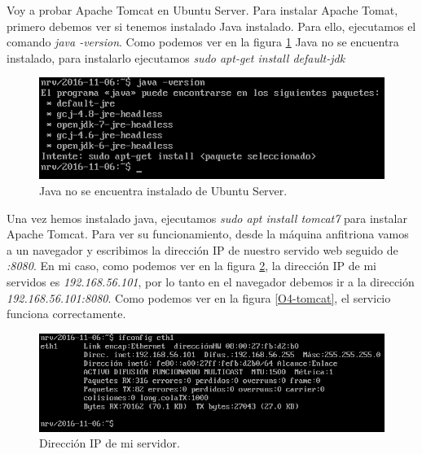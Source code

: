 \documentclass[a4paper,titlepage,12pt]{scrartcl}	%
\numberwithin{figure}{section} %
\numberwithin{table}{section} %
\begin{document}
	Voy a probar Apache Tomcat \cite{apachetomcat} en Ubuntu Server. Para instalar Apache Tomat, primero debemos ver si tenemos instalado Java instalado. Para ello, ejecutamos el comando \textit{java -version}. Como podemos ver en la figura \ref{O4-javaversion} Java no se encuentra instalado, para instalarlo ejecutamos \textit{sudo apt-get install default-jdk}
	\begin{figure}[H]
		\includegraphics[width=\linewidth]{./Imagenes/O4-javaversion.png}
		\vspace{-0.5cm}
		\caption[Java no se encuentra instalado de Ubuntu Server.]{Java no se encuentra instalado de Ubuntu Server.}
		\label{O4-javaversion}
	\end{figure}
	
	Una vez hemos instalado java, ejecutamos \textit{sudo apt install tomcat7} para instalar Apache Tomcat. Para ver su funcionamiento, desde la máquina anfitriona vamos a un navegador y escribimos la dirección IP de nuestro servido web seguido de \textit{:8080}. En mi caso, como podemos ver en la figura \ref{O4-ip}, la dirección IP de mi servidos es \textit{192.168.56.101}, por lo tanto en el navegador debemos ir a la dirección \textit{192.168.56.101:8080}. Como podemos ver en la figura \ref{O4-tomcat}, el servicio funciona correctamente.
	\begin{figure}[H]
		\centering
		\includegraphics[scale=0.6]{./Imagenes/O4-ip.png}
		\caption[Dirección IP de mi servidor.]{Dirección IP de mi servidor.}
		\label{O4-ip}
	\end{figure}
	
\end{document}
